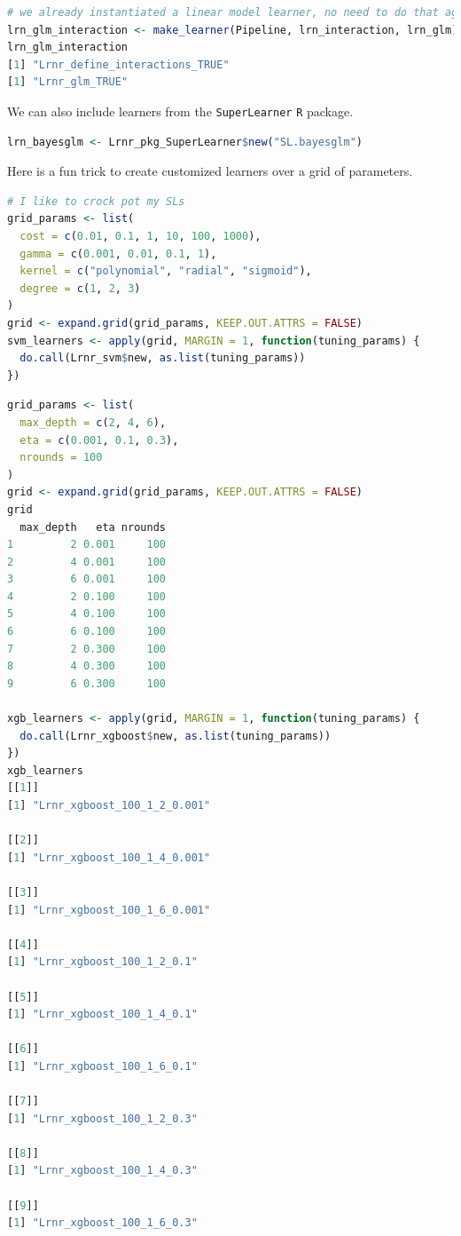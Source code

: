 \documentclass[
  12pt, krantz2,
]{krantz}
\newcommand{\passthrough}[1]{#1}
\newcommand{\1}{\mathbbm{1}}
\theoremstyle{definition}
\theoremstyle{definition}
\theoremstyle{definition}
\theoremstyle{definition}
\theoremstyle{remark}
\begin{document}
\begin{lstlisting}[language=R]
# we already instantiated a linear model learner, no need to do that again
lrn_glm_interaction <- make_learner(Pipeline, lrn_interaction, lrn_glm)
lrn_glm_interaction
[1] "Lrnr_define_interactions_TRUE"
[1] "Lrnr_glm_TRUE"
\end{lstlisting}

We can also include learners from the \passthrough{\lstinline!SuperLearner!} \passthrough{\lstinline!R!} package.

\begin{lstlisting}[language=R]
lrn_bayesglm <- Lrnr_pkg_SuperLearner$new("SL.bayesglm")
\end{lstlisting}

Here is a fun trick to create customized learners over a grid of parameters.

\begin{lstlisting}[language=R]
# I like to crock pot my SLs
grid_params <- list(
  cost = c(0.01, 0.1, 1, 10, 100, 1000),
  gamma = c(0.001, 0.01, 0.1, 1),
  kernel = c("polynomial", "radial", "sigmoid"),
  degree = c(1, 2, 3)
)
grid <- expand.grid(grid_params, KEEP.OUT.ATTRS = FALSE)
svm_learners <- apply(grid, MARGIN = 1, function(tuning_params) {
  do.call(Lrnr_svm$new, as.list(tuning_params))
})
\end{lstlisting}

\begin{lstlisting}[language=R]
grid_params <- list(
  max_depth = c(2, 4, 6),
  eta = c(0.001, 0.1, 0.3),
  nrounds = 100
)
grid <- expand.grid(grid_params, KEEP.OUT.ATTRS = FALSE)
grid
  max_depth   eta nrounds
1         2 0.001     100
2         4 0.001     100
3         6 0.001     100
4         2 0.100     100
5         4 0.100     100
6         6 0.100     100
7         2 0.300     100
8         4 0.300     100
9         6 0.300     100

xgb_learners <- apply(grid, MARGIN = 1, function(tuning_params) {
  do.call(Lrnr_xgboost$new, as.list(tuning_params))
})
xgb_learners
[[1]]
[1] "Lrnr_xgboost_100_1_2_0.001"

[[2]]
[1] "Lrnr_xgboost_100_1_4_0.001"

[[3]]
[1] "Lrnr_xgboost_100_1_6_0.001"

[[4]]
[1] "Lrnr_xgboost_100_1_2_0.1"

[[5]]
[1] "Lrnr_xgboost_100_1_4_0.1"

[[6]]
[1] "Lrnr_xgboost_100_1_6_0.1"

[[7]]
[1] "Lrnr_xgboost_100_1_2_0.3"

[[8]]
[1] "Lrnr_xgboost_100_1_4_0.3"

[[9]]
[1] "Lrnr_xgboost_100_1_6_0.3"
\end{lstlisting}
\end{document}

